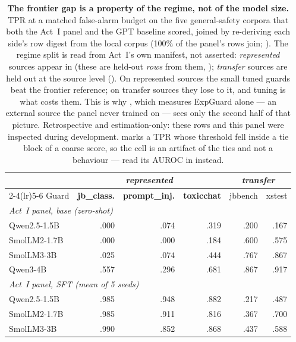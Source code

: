 \begin{table}[htbp]\centering\footnotesize
\caption{\textbf{The frontier gap is a property of the regime, not of the model size.} TPR at a matched \HtwoBudget{} false-alarm budget on the five general-safety corpora that both the Act~I panel and the GPT baseline scored, joined by re-deriving each side's row digest from the local corpus (100\% of the panel's rows join; ). The regime split is read from Act~I's own manifest, not asserted: \emph{represented} sources appear in  (these are held-out \emph{rows} from them, ); \emph{transfer} sources are held out at the source level (). On represented sources the small tuned guards beat the frontier reference; on transfer sources they lose to it, and tuning is what costs them. This is why , which measures ExpGuard alone --- an external source the panel never trained on --- sees only the second half of that picture. Retrospective and estimation-only: these rows and this panel were inspected during development. \textdagger{} marks a TPR whose threshold fell inside a tie block of a coarse score, so the cell is an artifact of the ties and not a behaviour --- read its AUROC in  instead.}
\label{tab:h2h}
\begin{tabular}{lrrrrr}\toprule
& \multicolumn{3}{c}{\emph{represented}} & \multicolumn{2}{c}{\emph{transfer}} \\
\cmidrule(lr){2-4}\cmidrule(lr){5-6}
Guard & \textbf{jb\_class.} & \textbf{prompt\_inj.} & \textbf{toxicchat} & jbbench & xstest \\
\midrule
\multicolumn{6}{l}{\emph{Act~I panel, base (zero-shot)}} \\
Qwen2.5-1.5B & .000 & .074 & .319 & \textdagger{}.200 & \textdagger{}.167 \\
SmolLM2-1.7B & .000 & .000 & .184 & .600 & .575 \\
SmolLM3-3B & .025 & .074 & .444 & .767 & .867 \\
Qwen3-4B & .557 & \textdagger{}.296 & .681 & .867 & .917 \\
\midrule
\multicolumn{6}{l}{\emph{Act~I panel, SFT (mean of 5 seeds)}} \\
Qwen2.5-1.5B & .985 & .948 & .882 & .217 & .487 \\
SmolLM2-1.7B & .985 & .911 & .816 & .367 & .700 \\
SmolLM3-3B & .990 & .852 & .868 & .437 & .588 \\

\end{tabular}
\end{table}
